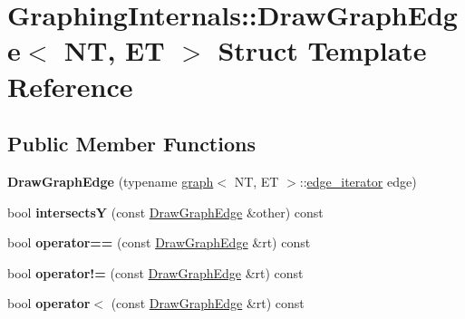 \hypertarget{structGraphingInternals_1_1DrawGraphEdge}{\section{Graphing\+Internals\+:\+:Draw\+Graph\+Edge$<$ N\+T, E\+T $>$ Struct Template Reference}
\label{structGraphingInternals_1_1DrawGraphEdge}
}
\subsection*{Public Member Functions}
\begin{DoxyCompactItemize}
\item 
\hypertarget{structGraphingInternals_1_1DrawGraphEdge_a611001de48b0a250e98640f21259ef5d}{{\bfseries Draw\+Graph\+Edge} (typename \hyperlink{classgraph}{graph}$<$ N\+T, E\+T $>$\+::\hyperlink{classedge__iterator}{edge\+\_\+iterator} edge)}\label{structGraphingInternals_1_1DrawGraphEdge_a611001de48b0a250e98640f21259ef5d}

\item 
\hypertarget{structGraphingInternals_1_1DrawGraphEdge_ac23c07c80ebe47d6c3f35d230debdf27}{bool {\bfseries intersects\+Y} (const \hyperlink{structGraphingInternals_1_1DrawGraphEdge}{Draw\+Graph\+Edge} \&other) const }\label{structGraphingInternals_1_1DrawGraphEdge_ac23c07c80ebe47d6c3f35d230debdf27}

\item 
\hypertarget{structGraphingInternals_1_1DrawGraphEdge_aa94e7366ffcacafa180303f626af2f1c}{bool {\bfseries operator==} (const \hyperlink{structGraphingInternals_1_1DrawGraphEdge}{Draw\+Graph\+Edge} \&rt) const }\label{structGraphingInternals_1_1DrawGraphEdge_aa94e7366ffcacafa180303f626af2f1c}

\item 
\hypertarget{structGraphingInternals_1_1DrawGraphEdge_a2d7f280a0c085e4d2bd45f7210647c73}{bool {\bfseries operator!=} (const \hyperlink{structGraphingInternals_1_1DrawGraphEdge}{Draw\+Graph\+Edge} \&rt) const }\label{structGraphingInternals_1_1DrawGraphEdge_a2d7f280a0c085e4d2bd45f7210647c73}

\item 
\hypertarget{structGraphingInternals_1_1DrawGraphEdge_a3e244dfc1d1404cb8507592a97c77f5b}{bool {\bfseries operator$<$} (const \hyperlink{structGraphingInternals_1_1DrawGraphEdge}{Draw\+Graph\+Edge} \&rt) const }\label{structGraphingInternals_1_1DrawGraphEdge_a3e244dfc1d1404cb8507592a97c77f5b}


\end{DoxyCompactItemize}
